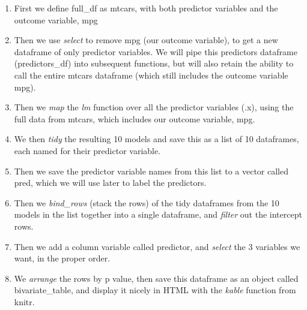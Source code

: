\documentclass[
]{book}
\begin{document}
\begin{enumerate}
\def\labelenumi{\arabic{enumi}.}
\item
  First we define full\_df as mtcars, with both predictor variables and the outcome variable, mpg
\item
  Then we use \emph{select} to remove mpg (our outcome variable), to get a new dataframe of only predictor variables. We will pipe this predictors dataframe (predictors\_df) into subsequent functions, but will also retain the ability to call the entire mtcars dataframe (which still includes the outcome variable mpg).
\item
  Then we \emph{map} the \emph{lm} function over all the predictor variables (.x), using the full data from mtcars, which includes our outcome variable, mpg.
\item
  We then \emph{tidy} the resulting 10 models and save this as a list of 10 dataframes, each named for their predictor variable.
\item
  Then we save the predictor variable names from this list to a vector called pred, which we will use later to label the predictors.
\item
  Then we \emph{bind\_rows} (stack the rows) of the tidy dataframes from the 10 models in the list together into a single dataframe, and \emph{filter} out the intercept rows.
\item
  Then we add a column variable called predictor, and \emph{select} the 3 variables we want, in the proper order.
\item
  We \emph{arrange} the rows by p value, then save this dataframe as an object called bivariate\_table, and display it nicely in HTML with the \emph{kable} function from knitr.
\end{enumerate}
\end{document}
